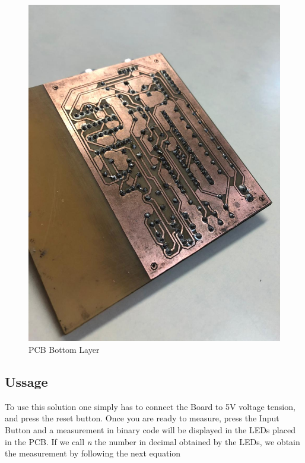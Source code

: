 \begin{figure}[H]
\begin{centering}
\includegraphics[scale=0.2]{images/BOT}
\par\end{centering}
\caption{PCB Bottom Layer}

\end{figure}

\subsection{Ussage}

To use this solution one simply has to connect the Board to 5V voltage
tension, and press the reset button. Once you are ready to measure,
press the Input Button and a measurement in binary code will be displayed
in the LEDs placed in the PCB. If we call \emph{n} the number in decimal
obtained by the LEDs, we obtain the measurement by following the next
equation

